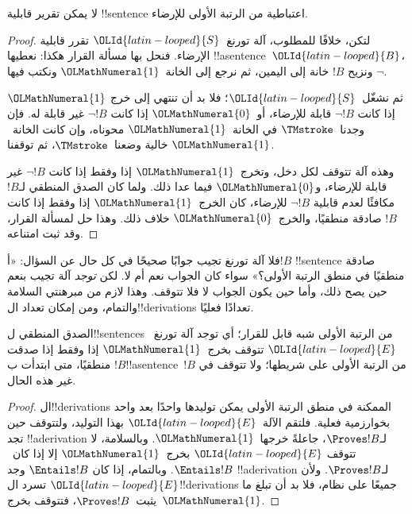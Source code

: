 \documentclass[../../../include/open-logic-section]{subfiles}
\begin{document}
\begin{cor}%
لا يمكن تقرير قابلية !!{sentence} اعتباطية من الرتبة الأولى
للإرضاء.
\end{cor}

\begin{proof}
  لتكن، خلافًا للمطلوب، آلة تورنغ~$\OLId{latin-looped}{S}$ تقرر قابلية الإرضاء.
  فنحل بها مسألة القرار هكذا: نعطيها !!a{sentence}~$\OLId{latin-looped}{B}$،
  ونزيح $!B$ خانة إلى اليمين، ثم نرجع إلى الخانة~$\OLMathNumeral{1}$
  ونكتب فيها $\lnot$.

  ثم نشغّل~$\OLId{latin-looped}{S}$؛ فلا بد أن تنتهي إلى خرج $\OLMathNumeral{1}$ إذا كانت
  $\lnot !B$ قابلة للإرضاء، أو~$\OLMathNumeral{0}$ إذا كانت $\lnot !B$
  غير قابلة له. فإن وجدنا~$\TMstroke$ في الخانة~$\OLMathNumeral{1}$
  محوناه، وإن كانت الخانة~$\OLMathNumeral{1}$ خالية وضعنا~$\TMstroke$،
  ثم توقفنا.

  وهذه آلة تتوقف لكل دخل، وتخرج~$\OLMathNumeral{1}$ إذا وفقط إذا كانت
  $\lnot !B$ غير قابلة للإرضاء، و$\OLMathNumeral{0}$ فيما عدا ذلك.
  ولما كان الصدق المنطقي لـ$!B$ مكافئًا لعدم قابلية
  $\lnot !B$ للإرضاء، كان الخرج~$\OLMathNumeral{1}$ إذا وفقط إذا كانت
  $!B$ صادقة منطقيًا، والخرج~$\OLMathNumeral{0}$ خلاف ذلك. وهذا حل لمسألة
  القرار، وقد ثبت امتناعه.
\end{proof}

\begin{explain}
فلا آلة تورنغ تجيب جوابًا صحيحًا في كل حال عن السؤال:
«أ$!B$ !!{sentence} صادقة منطقيًا في منطق الرتبة الأولى؟»
سواء كان الجواب نعم أم لا. لكن \emph{توجد} آلة تجيب بنعم حين
يصح ذلك، وأما حين يكون الجواب لا فلا تتوقف. وهذا لازم من
مبرهنتي السلامة والتمام، ومن إمكان تعداد ال!!{derivation}s
تعدادًا فعليًا.
\end{explain}

\begin{thm}
  الصدق المنطقي ل!!{sentence}s من الرتبة الأولى شبه قابل
  للقرار؛ أي توجد آلة تورنغ~$\OLId{latin-looped}{E}$ تتوقف بخرج~$\OLMathNumeral{1}$ إذا وفقط إذا
  صدقت $!B$ منطقيًا، متى ابتدأت ب!!a{sentence}~$!B$
  من الرتبة الأولى على شريطها؛ ولا تتوقف في غير هذه الحال.
\end{thm}

\begin{proof}
  ال!!{derivation}s الممكنة في منطق الرتبة الأولى يمكن توليدها
  واحدًا بعد واحد بخوارزمية فعلية. فلتقم الآلة~$\OLId{latin-looped}{E}$ بهذا
  التوليد، ولتتوقف حين تجد !!a{derivation} لـ$\Proves !B$،
  جاعلةً خرجها~$\OLMathNumeral{1}$. وبالسلامة، لا تتوقف $\OLId{latin-looped}{E}$ بخرج~$\OLMathNumeral{1}$
  إلا إذا كان~$\Entails !B$. وبالتمام، إذا كان
  $\Entails !B$ وجد !!a{derivation} لـ$\Proves !B$.
  ولأن $\OLId{latin-looped}{E}$ تسرد ال!!{derivation}s جميعًا على نظام،
  فلا بد أن تبلغ ما يثبت~$\Proves !B$، فتتوقف بخرج~$\OLMathNumeral{1}$.
\end{proof}
\end{document}
